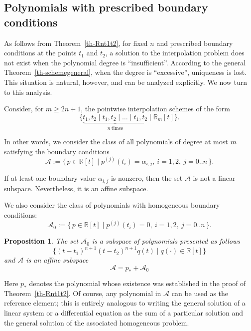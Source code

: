 \documentclass{article}
\newtheorem{proposition}[theorem]{Proposition}	%
\theoremstyle{definition}
\theoremstyle{definition}
\numberwithin{figure}{section}
\newcommand{\1}{\mathbf{1}}
\begin{document}
\subsection{Polynomials with prescribed boundary conditions}

As follows from Theorem~\ref{th-Rnt1t2}, for fixed $n$ and prescribed boundary conditions at the points $t_1$ and $t_2$, a solution to the interpolation problem does not exist when the polynomial degree is ``insufficient''. According to the general Theorem~\ref{th-schemegeneral}, when the degree is ``excessive'', uniqueness is lost. This situation is natural, however, and can be analyzed explicitly. We now turn to this analysis.

Consider, for $m \ge 2n+1$, the pointwise interpolation schemes of the form
\begin{equation}\label{schem-Rm}
    \{\underbrace{t_1, t_2 \mid t_1, t_2 \mid \ldots \mid t_1, t_2}_{n\ \text{times}} \mid \mathbb{R}_{m}[t]\}.
\end{equation}

In other words, we consider the class of all polynomials of degree at most $m$ satisfying the boundary conditions
\begin{equation}
    \mathcal{A}
    :=
    \{\,p \in \mathbb{R}[t] \mid p^{(j)}(t_i) = \alpha_{i,j},\ i = 1,2,\ j = 0..n\,\}.
\end{equation}

If at least one boundary value $\alpha_{i,j}$ is nonzero, then the set $\mathcal{A}$ is not a linear subspace. Nevertheless, it is an affine subspace.

\bigskip

We also consider the class of polynomials with homogeneous boundary conditions:
\begin{equation}
    \mathcal{A}_0
    :=
    \{\,p \in \mathbb{R}[t] \mid p^{(j)}(t_i) = 0,\ i = 1,2,\ j = 0..n\,\}.
\end{equation}

\begin{proposition}\label{prop-aff}
    The set $\mathcal{A}_0$ is a subspace of polynomials presented as follows
    \[
	\{(t-t_1)^{n+1}(t-t_2)^{n+1}q(t)\mid q(\cdot)\in \mathbb{R}[t]\}
    \]
    and $\mathcal{A}$ is an affine subspace 
    \[
	\mathcal{A} = p_*+ \mathcal{A}_0
    \]
\end{proposition}

Here $p_*$ denotes the polynomial whose existence was established in the proof of Theorem~\ref{th-Rnt1t2}. Of course, any polynomial in $\mathcal{A}$ can be used as the reference element; this is entirely analogous to writing the general solution of a linear system or a differential equation as the sum of a particular solution and the general solution of the associated homogeneous problem.
\end{document}
